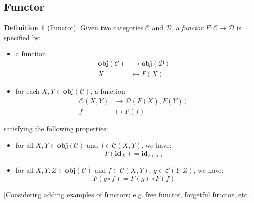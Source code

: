 \documentclass[12pt,twoside,a4paper]{report}
\theoremstyle{definition}
\newtheorem*{definition*}{Definition}
\begin{document}
        \subsection{Functor}
        \begin{definition*}[Functor]
            Given two categories $\mathcal{C}$ and $\mathcal{D}$, a \emph{functor} $F: \mathcal{C} \to \mathcal{D}$ is specified by:
            \begin{itemize}
                \item 
                    a function 
                    \[\begin{aligned}
                        \textbf{obj}(\mathcal{C}) &\to \textbf{obj}(\mathcal{D}) \\
                        X &\mapsto F(X)
                    \end{aligned}\]

                \item 
                    for each $X, Y \in \textbf{obj}(\mathcal{C})$, a function 
                    \[\begin{aligned}
                        \mathcal{C}{(X,Y)} &\to \mathcal{D}{(F(X),F(Y))} \\
                        f &\mapsto F(f)
                    \end{aligned}\]
            \end{itemize}
            satisfying the following properties:
            \begin{itemize}
                \item 
                    for all $X, Y \in \textbf{obj}(\mathcal{C})$ and $f \in \mathcal{C}{(X,Y)}$, we have:
                    \begin{equation} \label{law: functor_id}
                        F(\textbf{id}_X) = \textbf{id}_{F(X)}
                    \end{equation}
                \item
                    for all $X, Y, Z \in \textbf{obj}(\mathcal{C})$ and $f \in \mathcal{C}{(X,Y)}$, $g \in \mathcal{C}{(Y,Z)}$, we have:
                    \begin{equation} \label{law: functor_comp}
                        F(g \circ f) = F(g) \circ F(f)
                    \end{equation}
            \end{itemize}
        \end{definition*}
        [Considering adding examples of functors: e.g. free functor, forgetful functor, etc.]
\end{document}
